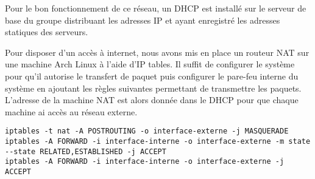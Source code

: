 Pour le bon fonctionnement de ce réseau, un DHCP est installé sur le serveur de base du groupe distribuant les adresses IP et ayant enregistré les adresses statiques des serveurs.

Pour disposer d'un accès à internet, nous avons mis en place un routeur NAT sur une machine Arch Linux à l'aide d'IP tables.
Il suffit de configurer le système pour qu'il autorise le transfert de paquet puis configurer le pare-feu interne du système en ajoutant les règles suivantes permettant de transmettre les paquets.
L'adresse de la machine NAT est alors donnée dans le DHCP pour que chaque machine ai accès au réseau externe.

\begin{lstlisting}[caption=Commandes iptables permettant l'installation d'un NAT]
iptables -t nat -A POSTROUTING -o interface-externe -j MASQUERADE
iptables -A FORWARD -i interface-interne -o interface-externe -m state --state RELATED,ESTABLISHED -j ACCEPT
iptables -A FORWARD -i interface-interne -o interface-externe -j ACCEPT
\end{lstlisting}
